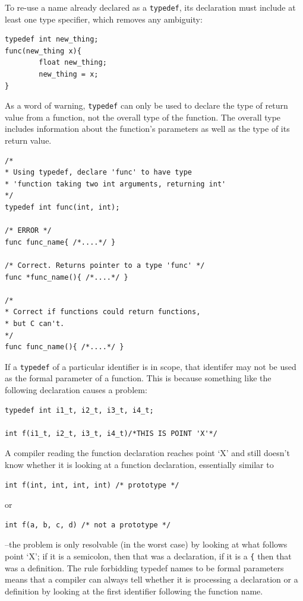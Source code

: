   To re-use a name already declared as a \texttt{typedef}, its
   declaration must include at least one type specifier, which removes any
   ambiguity:


\begin{Verbatim}
typedef int new_thing;
func(new_thing x){
        float new_thing;
        new_thing = x;
}
\end{Verbatim}

  As a word of warning, \texttt{typedef} can only be used to declare
   the type of return value from a function, not the overall type of the
   function. The overall type includes information about the function's
   parameters as well as the type of its return value.


\begin{Verbatim}
/*
* Using typedef, declare 'func' to have type
* 'function taking two int arguments, returning int'
*/
typedef int func(int, int);

/* ERROR */
func func_name{ /*....*/ }

/* Correct. Returns pointer to a type 'func' */
func *func_name(){ /*....*/ }

/*
* Correct if functions could return functions,
* but C can't.
*/
func func_name(){ /*....*/ }
\end{Verbatim}

  If a \texttt{typedef} of a particular identifier is in scope, that
   identifer may not be used as the formal parameter of a function. This is
   because something like the following declaration causes a problem:


\begin{Verbatim}
typedef int i1_t, i2_t, i3_t, i4_t;

int f(i1_t, i2_t, i3_t, i4_t)/*THIS IS POINT 'X'*/
\end{Verbatim}

  A compiler reading the function declaration reaches point `X' and
   still doesn't know whether it is looking at a function declaration,
   essentially similar to


\begin{Verbatim}
int f(int, int, int, int) /* prototype */
\end{Verbatim}

  or


\begin{Verbatim}
int f(a, b, c, d) /* not a prototype */
\end{Verbatim}

  --the problem is only resolvable (in the worst case) by looking at
   what follows point `X'; if it is a semicolon, then that was
   a declaration, if it is a \texttt{\{} then that was a definition. The
   rule forbidding typedef names to be formal parameters means that
   a compiler can always tell whether it is processing a declaration or
   a definition by looking at the first identifier following the function
   name.


